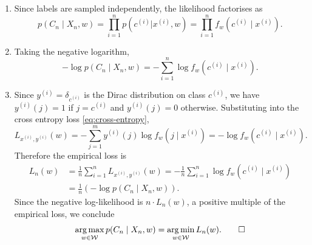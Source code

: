 \documentclass[11pt]{article}
\DeclareMathOperator*{\argmin}{arg\,min}
\DeclareMathOperator*{\argmax}{arg\,max}
\newcommand{\W}{\mathcal{W}}
\begin{document}
\begin{solution}
\begin{enumerate}
    \item
        Since labels are sampled independently, the likelihood factorises as
        \begin{equation*}
            p(C_n \mid X_n, w)
            = \prod_{i=1}^n p(c^{(i)} | x^{(i)}, w)
            = \prod_{i=1}^n f_w(c^{(i)} \mid x^{(i)}).
        \end{equation*}

    \item
        Taking the negative logarithm,
        \begin{equation*}
            -\log p(C_n \mid X_n, w)
            = -\sum_{i=1}^n \log f_w(c^{(i)} \mid x^{(i)}).
        \end{equation*}

    \item
        Since $y^{(i)} = \delta_{c^{(i)}}$ is the Dirac distribution on class
        $c^{(i)}$, we have $y^{(i)}(j) = 1$ if $j = c^{(i)}$ and $y^{(i)}(j)
        = 0$ otherwise. Substituting into the cross entropy loss
        \eqref{eq:cross-entropy},
        \begin{equation*}
            L_{x^{(i)},y^{(i)}}(w)
            = -\sum_{j=1}^m y^{(i)}(j) \log f_w(j \mid x^{(i)})
            = -\log f_w(c^{(i)} \mid x^{(i)}).
        \end{equation*}
        Therefore the empirical loss is
        \begin{align*}
            L_n(w)
            &= \frac{1}{n}\sum_{i=1}^n L_{x^{(i)},y^{(i)}}(w)
            = -\frac{1}{n}\sum_{i=1}^n \log f_w(c^{(i)} \mid x^{(i)}) \\
            &= \frac{1}{n}\left(-\log p(C_n \mid X_n, w)\right).
        \end{align*}
        Since the negative log-likelihood is $n \cdot L_n(w)$, a positive
        multiple of the empirical loss, we conclude
        \begin{equation*}
            \argmax_{w\in\W} p(C_n \mid X_n, w)
            = \argmin_{w\in\W} L_n(w). \qedhere
        \end{equation*}
\end{enumerate}
\end{solution}
\end{document}
